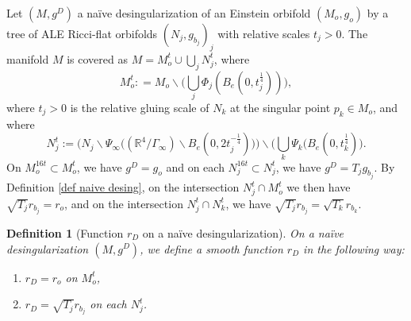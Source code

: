 \documentclass[11pt,reqno]{amsart}
\numberwithin{equation}{section}
\newtheorem{defn}[thm]{Definition}
\theoremstyle{definition}
\theoremstyle{remark}
\begin{document}
 Let $(M,g^D)$ a naïve desingularization of an Einstein orbifold $(M_o,g_o)$ by a tree of ALE Ricci-flat orbifolds $(N_j,g_{b_j})_j$ with relative scales $t_j>0$. The manifold $M$ is covered as $M = M_o^t\cup \bigcup_jN_j^t$, where
\begin{equation}\label{def Mot}
    M_o^t: = M_o \backslash \Big(\bigcup_j \Phi_j(B_e(0,t_j^{\frac14})) \Big),
\end{equation}
 where $t_j>0$ is the relative gluing scale of $N_k$ at the singular point $p_k\in M_o$, and where 
 \begin{equation}\label{def Njt}
     N_j^t:= \Big(N_j\backslash \Psi_\infty \Big((\mathbb{R}^4\slash \Gamma_\infty)\backslash B_e(0, 2t_j^{-\frac14}) \Big)\Big) \backslash \Big(\bigcup_k \Psi_k(B_e(0,t_k^{\frac14}) \Big).
 \end{equation}
On $M_o^{16t}\subset M_o^t$, we have $g^D = g_o$ and on each $N_j^{16t}\subset N_j^t$, we have $g^D = T_j g_{b_j}$. By Definition \ref{def naive desing}, on the intersection $N_j^t\cap M_o^t$ we then have $\sqrt{T_j}r_{b_j} = r_o $, and on the intersection $N_j^t\cap N_k^t$, we have $\sqrt{T_j}r_{b_j} = \sqrt{T_k}r_{b_k}$.

\begin{defn}[Function $r_D$ on a naïve desingularization]\label{definition rD}
    On a naïve desingularization $(M,g^D)$, we define a smooth function $r_D$ in the following way:
    \begin{enumerate}
        \item $r_D = r_o$ on $M_o^t$,
        \item $r_D = \sqrt{T_j}r_{b_j}$ on each $N_j^t$.
    \end{enumerate}
\end{defn}
\end{document}
